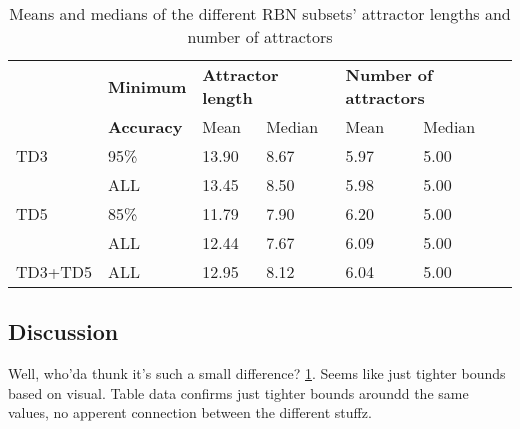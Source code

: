 \begin{table}[]
    \centering
    \caption{Means and medians of the different RBN subsets' attractor lengths and number of attractors}
    \label{tab:attractor-values}
    \begin{tabular}{llllll}
        \hline
        \hline
        & \textbf{Minimum} & \multicolumn{2}{l}{\textbf{Attractor length}} & \multicolumn{2}{l}{\textbf{Number of attractors}} \\
        & \textbf{Accuracy} & Mean & Median & Mean & Median \\
        \hline
        TD3 & 95\% & 13.90 & 8.67 & 5.97 & 5.00 \\
            & ALL  & 13.45 & 8.50 & 5.98 & 5.00 \\

        TD5 & 85\% & 11.79 & 7.90 & 6.20 & 5.00 \\
            & ALL  & 12.44 & 7.67 & 6.09 & 5.00 \\

        TD3+TD5 & ALL & 12.95 & 8.12 & 6.04 & 5.00 \\
        \hline
    \end{tabular}
\end{table}

\subsection{Discussion}

Well, who'da thunk it's such a small difference? \ref{tab:attractor-values}.
Seems like just tighter bounds based on visual.
Table data confirms just tighter bounds aroundd the same values, no apperent connection between the different stuffz.
